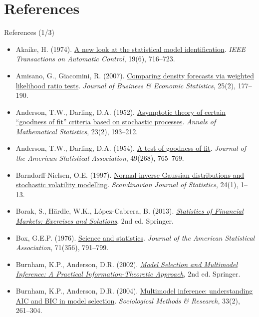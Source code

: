 \section{References}

\begin{frame}{References (1/3)}
\itemsize{\tiny}
\begin{itemize}
    \item Akaike, H. (1974). \href{https://doi.org/10.1109/TAC.1974.1100705}{A new look at the statistical model identification}. \textit{IEEE Transactions on Automatic Control}, 19(6), 716--723.
    \item Amisano, G., Giacomini, R. (2007). \href{https://doi.org/10.1198/073500106000000332}{Comparing density forecasts via weighted likelihood ratio tests}. \textit{Journal of Business \& Economic Statistics}, 25(2), 177--190.
    \item Anderson, T.W., Darling, D.A. (1952). \href{https://doi.org/10.1214/aoms/1177729437}{Asymptotic theory of certain ``goodness of fit'' criteria based on stochastic processes}. \textit{Annals of Mathematical Statistics}, 23(2), 193--212.
    \item Anderson, T.W., Darling, D.A. (1954). \href{https://doi.org/10.1080/01621459.1954.10501232}{A test of goodness of fit}. \textit{Journal of the American Statistical Association}, 49(268), 765--769.
    \item Barndorff-Nielsen, O.E. (1997). \href{https://doi.org/10.1111/1467-9469.00045}{Normal inverse Gaussian distributions and stochastic volatility modelling}. \textit{Scandinavian Journal of Statistics}, 24(1), 1--13.
    \item Borak, S., Härdle, W.K., López-Cabrera, B. (2013). \href{https://doi.org/10.1007/978-3-642-33929-5}{\textit{Statistics of Financial Markets: Exercises and Solutions}}, 2nd ed. Springer.
    \item Box, G.E.P. (1976). \href{https://doi.org/10.1080/01621459.1976.10480949}{Science and statistics}. \textit{Journal of the American Statistical Association}, 71(356), 791--799.
    \item Burnham, K.P., Anderson, D.R. (2002). \href{https://doi.org/10.1007/b97636}{\textit{Model Selection and Multimodel Inference: A Practical Information-Theoretic Approach}}, 2nd ed. Springer.
    \item Burnham, K.P., Anderson, D.R. (2004). \href{https://doi.org/10.1177/0049124104268644}{Multimodel inference: understanding AIC and BIC in model selection}. \textit{Sociological Methods \& Research}, 33(2), 261--304.

\end{itemize}
\end{frame}
